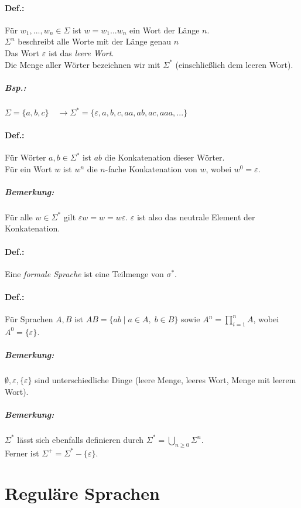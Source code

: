 \documentclass{scrreprt}
\begin{document}
\paragraph{Def.:} Für $w_1, ..., w_n \in \Sigma$ ist $w=w_1...w_n$ ein Wort der Länge $n$.\\
$\Sigma^n$ beschreibt alle Worte mit der Länge genau $n$\\
Das Wort $\varepsilon$ ist das \emph{leere Wort}.\\
Die Menge aller Wörter bezeichnen wir mit $\Sigma^*$ (einschließlich dem leeren Wort).

\subparagraph{Bsp.:} $\Sigma = \{a,b,c\}\quad \rightarrow \Sigma^*=\{\varepsilon, a, b, c, aa, ab,a c, aaa, ...\}$
\paragraph{Def.:} Für Wörter $a,b \in \Sigma^*$ ist $ab$ die Konkatenation dieser Wörter.\\
Für ein Wort $w$ ist $w^n$ die $n$-fache Konkatenation von $w$, wobei $w^0=\varepsilon$.

\subparagraph{Bemerkung:} Für alle $w \in \Sigma^*$ gilt $\varepsilon w = w = w \varepsilon$. $\varepsilon$ ist also das neutrale Element der Konkatenation.

\paragraph{Def.:} Eine \emph{formale Sprache} ist eine Teilmenge von $\sigma^*$.

\paragraph{Def.:} Für Sprachen $A, B$ ist $AB=\{ab \;|\; a \in A, \; b \in B\}$ sowie $A^n=\prod_{i=1}^{n}A$, wobei $A^0=\{\varepsilon\}$.
\subparagraph{Bemerkung:} $\emptyset, \varepsilon, \{\varepsilon\}$ sind unterschiedliche Dinge (leere Menge, leeres Wort, Menge mit leerem Wort).

\subparagraph{Bemerkung:} $\Sigma^*$ lässt sich ebenfalls definieren durch $\Sigma^*=\bigcup_{n\geq 0}\Sigma^n$.\\
Ferner ist $\Sigma^+=\Sigma^*-\{\varepsilon\}$.

\section{Reguläre Sprachen}
\end{document}
